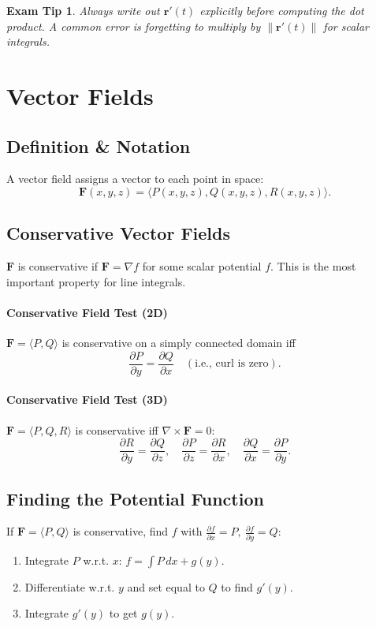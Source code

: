 \documentclass[12pt]{article}
\newcommand{\grad}{\nabla}
\newcommand{\curl}{\nabla\times}
\newtheorem{tip}{Exam Tip}[section]
\begin{document}
\begin{tip}
Always write out \(\mathbf{r}'(t)\) explicitly before computing the dot product. A common error is forgetting to multiply by \(\|\mathbf{r}'(t)\|\) for scalar integrals.
\end{tip}

\section{Vector Fields}

\subsection{Definition \& Notation}
A vector field assigns a vector to each point in space:
\[
\mathbf{F}(x,y,z) = \langle P(x,y,z), Q(x,y,z), R(x,y,z)\rangle.
\]

\subsection{Conservative Vector Fields}
\(\mathbf{F}\) is conservative if \(\mathbf{F} = \grad f\) for some scalar potential \(f\). This is the most important property for line integrals.

\paragraph{Conservative Field Test (2D)}
\(\mathbf{F}=\langle P,Q\rangle\) is conservative on a simply connected domain iff
\[
\frac{\partial P}{\partial y} = \frac{\partial Q}{\partial x} \quad (\text{i.e., curl is zero}).
\]

\paragraph{Conservative Field Test (3D)}
\(\mathbf{F}=\langle P,Q,R\rangle\) is conservative iff \(\curl \mathbf{F}=0\):
\[
\frac{\partial R}{\partial y} = \frac{\partial Q}{\partial z},\quad \frac{\partial P}{\partial z} = \frac{\partial R}{\partial x},\quad \frac{\partial Q}{\partial x} = \frac{\partial P}{\partial y}.
\]

\subsection{Finding the Potential Function}
If \(\mathbf{F}=\langle P,Q\rangle\) is conservative, find \(f\) with \(\frac{\partial f}{\partial x}=P,\ \frac{\partial f}{\partial y}=Q\):
\begin{enumerate}
    \item Integrate \(P\) w.r.t. \(x\): \(f = \int P\,dx + g(y)\).
    \item Differentiate w.r.t. \(y\) and set equal to \(Q\) to find \(g'(y)\).
    \item Integrate \(g'(y)\) to get \(g(y)\).
\end{enumerate}
\end{document}

